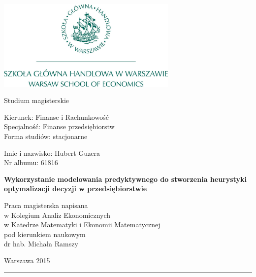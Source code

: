 \documentclass[polish, twoside, 12pt, a4paper]{article}
\theoremstyle{definition}
\theoremstyle{plain}
\theoremstyle{remark}
\begin{document}
\begin{titlepage}
\centering

\includegraphics[width=0.66\textwidth]{logo.JPG}

\vspace*{0.5cm}
Studium magisterskie\\
\begin{flushleft}
Kierunek: Finanse i Rachunkowość\\
Specjalność: Finanse przedsiębiorstw\\
Forma studiów: stacjonarne
\end{flushleft}

\vspace*{.5cm}
\rule{0cm}{1cm}\hfill
\begin{minipage}{9cm}
Imie i nazwisko: Hubert Guzera\\
Nr albumu: 61816
\end{minipage}

\vspace*{1cm}
\begin{minipage}{12cm}
\centering
\Large
\textbf{Wykorzystanie modelowania predyktywnego do stworzenia heurystyki optymalizacji decyzji w przedsiębiorstwie}
\end{minipage}

\vspace*{2cm}
\rule{0cm}{1cm}\hfill
\begin{minipage}{9cm}
Praca magisterska napisana\\
w Kolegium Analiz Ekonomicznych\\
w Katedrze Matematyki i Ekonomii Matematycznej\\
pod kierunkiem naukowym\\
dr hab. Michała Ramszy
\end{minipage}

\vfill
Warszawa 2015
\end{titlepage}

\rule{1ex}{0ex}\clearpage


\cleardoublepage
\tableofcontents
\end{document}
